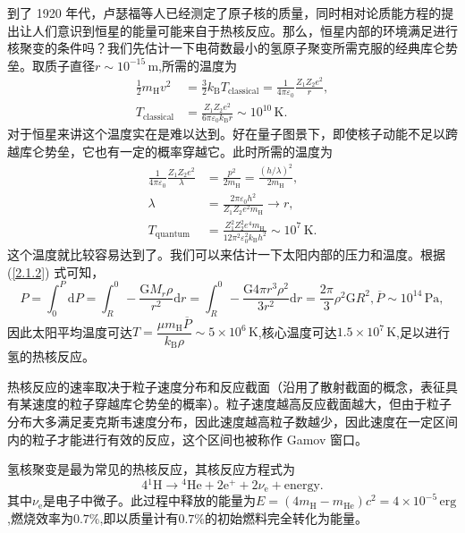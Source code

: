 \documentclass[../天体物理基础.tex]{subfiles}
\begin{document}
到了 1920 年代，卢瑟福等人已经测定了原子核的质量，同时相对论质能方程的提出让人们意识到恒星的能量可能来自于热核反应。那么，恒星内部的环境满足进行核聚变的条件吗？我们先估计一下电荷数最小的氢原子聚变所需克服的经典库仑势垒。取质子直径$r\sim10^{-15}\,\mathrm{m}$,所需的温度为
\begin{align}
\frac{1}{2}m_{\mathrm{H}}v^{2}&=\frac{3}{2}k_{\text{B}}T_{\text{classical}}=\frac{1}{4\pi\varepsilon_{0}}\frac{Z_{1}Z_{2}e^{2}}{r},\\
T_{\text{classical}}&=\frac{Z_{1}Z_{2}e^{2}}{6\pi\varepsilon_{0}k_{\text{B}}r}\sim10^{10}\,\mathrm{K}.
\end{align}
对于恒星来讲这个温度实在是难以达到。好在量子图景下，即使核子动能不足以跨越库仑势垒，它也有一定的概率穿越它。此时所需的温度为
\begin{align}
\frac{1}{4\pi\varepsilon_{0}}\frac{Z_{1}Z_{2}e^{2}}{\lambda}&=\frac{p^{2}}{2m_{\mathrm{H}}}=\frac{\left(h/\lambda\right)^{2}}{2m_{\mathrm{H}}},\\
\lambda&=\frac{2\pi\varepsilon_{0}h^{2}}{Z_{1}Z_{2}e^{2}m_{\mathrm{H}}}\to r,\\
T_{\text{quantum}}&=\frac{Z_{1}^{2}Z_{2}^{2}e^{4}m_{\mathrm{H}}}{12\pi^{2}\varepsilon_{0}^{2}k_{\text{B}}h^{2}}\sim10^{7}\,\mathrm{K}.
\end{align}
这个温度就比较容易达到了。我们可以来估计一下太阳内部的压力和温度。根据 (\ref{2.1.2}) 式可知，
\begin{equation}
P=\int_{0}^{P}\mathrm{d}P=\int_{R}^{0}-\frac{\mathrm{G}M_{r}\rho}{r^{2}}\mathrm{d}r=\int_{R}^{0}-\frac{\mathrm{G}4\pi{}r^{3}\rho^{2}}{3r^{2}}\mathrm{d}r=\frac{2\pi{}}{3}\rho^{2}\mathrm{G}R^{2},\overline{P}\sim10^{14}\,\mathrm{Pa},
\end{equation}
因此太阳平均温度可达$T=\dfrac{\mu m_{\mathrm{H}}\overline{P}}{k_{\text{B}}\rho}\sim5\times10^{6}\,\mathrm{K}$,核心温度可达$1.5\times10^{7}\,\mathrm{K}$,足以进行氢的热核反应。

热核反应的速率取决于粒子速度分布和反应截面（沿用了散射截面的概念，表征具有某速度的粒子穿越库仑势垒的概率）。粒子速度越高反应截面越大，但由于粒子分布大多满足麦克斯韦速度分布，因此速度越高粒子数越少，因此速度在一定区间内的粒子才能进行有效的反应，这个区间也被称作 Gamov 窗口。

氢核聚变是最为常见的热核反应，其核反应方程式为
\begin{equation}
4{}^{1}\mathrm{H}\to{}^{4}\mathrm{He}+2\mathrm{e}^{+}+2\nu_{\mathrm{e}}+\text{energy}.
\end{equation}
其中$\nu_{\text{e}}$是电子中微子。此过程中释放的能量为$E=\left(4m_{\mathrm{H}}-m_{\mathrm{He}}\right)c^{2}=4\times10^{-5}\,\mathrm{erg}$,燃烧效率为$0.7\%$,即以质量计有$0.7\%$的初始燃料完全转化为能量。
\end{document}
